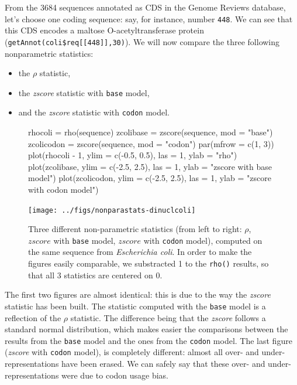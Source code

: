 \documentclass{article}
\begin{document}
From the 3684 sequences
annotated as CDS in the Genome Reviews database, let's choose one
coding sequence: say, for instance, number \texttt{448}. We can see
that this CDS encodes a maltose O-acetyltransferase protein
(\verb+getAnnot(coli$req[[448]],30)+). We will now compare the three
following nonparametric statistics:

\begin{itemize}
\item the $\rho$ statistic,
\item the \textit{zscore} statistic with \texttt{base} model,
\item and the \textit{zscore} statistic with \texttt{codon} model.
\end{itemize}

\begin{figure}[H]
  \begin{center}
\begin{Schunk}
\begin{Sinput}
 rhocoli = rho(sequence)
 zcolibase = zscore(sequence, mod = "base")
 zcolicodon = zscore(sequence, mod = "codon")
 par(mfrow = c(1, 3))
 plot(rhocoli - 1, ylim = c(-0.5, 0.5), las = 1, ylab = "rho")
 plot(zcolibase, ylim = c(-2.5, 2.5), las = 1, ylab = "zscore with base model")
 plot(zcolicodon, ylim = c(-2.5, 2.5), las = 1, ylab = "zscore with codon model")
\end{Sinput}
\end{Schunk}
\texttt{[image: ../figs/nonparastats-dinuclcoli]}
\end{center}
   \caption{Three different non-parametric statistics (from left to
   right: $\rho$, $zscore$ with \texttt{base} model, $zscore$ with
   \texttt{codon} model), computed on the same sequence from
   \textit{Escherichia coli}. In order to make the figures easily
   comparable, we substracted 1 to the \texttt{rho()} results, so that
   all 3 statistics are centered on 0. }
\label{dinuclcoli}
\end{figure}

The first two figures are almost identical: this is due to the way the
\textit{zscore} statistic has been built. The statistic computed with
the \texttt{base} model is a reflection of the $\rho$ statistic. The
difference being that the \textit{zscore} follows a standard normal
distribution, which makes easier the comparisons between the results
from the \texttt{base} model and the ones from the \texttt{codon}
model. The last figure (\textit{zscore} with \texttt{codon} model), is
completely different: almost all over- and under-representations have
been erased. We can safely say that these over- and
under-representations were due to codon usage bias.
\end{document}
